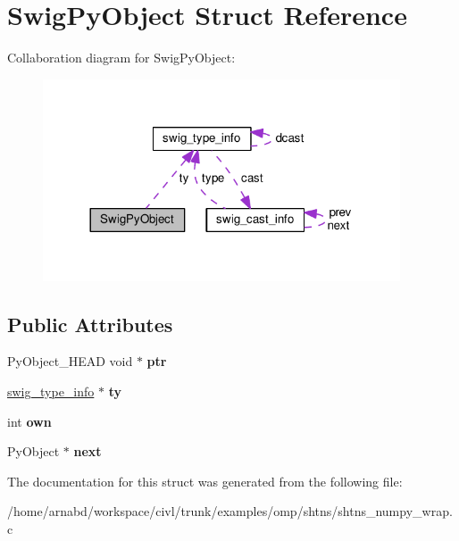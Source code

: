 \hypertarget{structSwigPyObject}{}\section{Swig\+Py\+Object Struct Reference}
\label{structSwigPyObject}


Collaboration diagram for Swig\+Py\+Object\+:
\nopagebreak
\begin{figure}[H]
\begin{center}
\leavevmode
\includegraphics[width=300pt]{structSwigPyObject__coll__graph}
\end{center}
\end{figure}
\subsection*{Public Attributes}
\begin{DoxyCompactItemize}
\item 
\hypertarget{structSwigPyObject_a41b1d569a8ba4fa9b1d87579c144891b}{}Py\+Object\+\_\+\+H\+E\+A\+D void $\ast$ {\bfseries ptr}\label{structSwigPyObject_a41b1d569a8ba4fa9b1d87579c144891b}

\item 
\hypertarget{structSwigPyObject_a510b5a6f66a8a33c0a54c3eeb83e5ba5}{}\hyperlink{structswig__type__info}{swig\+\_\+type\+\_\+info} $\ast$ {\bfseries ty}\label{structSwigPyObject_a510b5a6f66a8a33c0a54c3eeb83e5ba5}

\item 
\hypertarget{structSwigPyObject_a83cb6489fb1b171467f06c091ae6f283}{}int {\bfseries own}\label{structSwigPyObject_a83cb6489fb1b171467f06c091ae6f283}

\item 
\hypertarget{structSwigPyObject_af7b93d7ae49a6f3bdf6511043fe8e839}{}Py\+Object $\ast$ {\bfseries next}\label{structSwigPyObject_af7b93d7ae49a6f3bdf6511043fe8e839}

\end{DoxyCompactItemize}


The documentation for this struct was generated from the following file\+:\begin{DoxyCompactItemize}
\item 
/home/arnabd/workspace/civl/trunk/examples/omp/shtns/shtns\+\_\+numpy\+\_\+wrap.\+c\end{DoxyCompactItemize}
